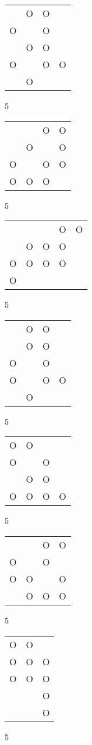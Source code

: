 \begin{tabular}{|m{0.2cm}m{0.2cm}m{0.2cm}m{0.2cm}|}\hline
 &O&O& \\
O& &O& \\
 &O&O& \\
O& &O&O\\
 &O& & \\
\hline\end{tabular}5
\begin{tabular}{|m{0.2cm}m{0.2cm}m{0.2cm}m{0.2cm}|}\hline
 & &O&O\\
 &O& &O\\
O& &O&O\\
O&O&O& \\
\hline\end{tabular}5
\begin{tabular}{|m{0.2cm}m{0.2cm}m{0.2cm}m{0.2cm}m{0.2cm}|}\hline
 & & &O&O\\
 &O&O&O& \\
O&O&O&O& \\
O& & & & \\
\hline\end{tabular}5
\begin{tabular}{|m{0.2cm}m{0.2cm}m{0.2cm}m{0.2cm}|}\hline
 &O&O& \\
 &O&O& \\
O& &O& \\
O& &O&O\\
 &O& & \\
\hline\end{tabular}5
\begin{tabular}{|m{0.2cm}m{0.2cm}m{0.2cm}m{0.2cm}|}\hline
O&O& & \\
O& &O& \\
 &O&O& \\
O&O&O&O\\
\hline\end{tabular}5
\begin{tabular}{|m{0.2cm}m{0.2cm}m{0.2cm}m{0.2cm}|}\hline
 & &O&O\\
O& &O& \\
O&O& &O\\
 &O&O&O\\
\hline\end{tabular}5
\begin{tabular}{|m{0.2cm}m{0.2cm}m{0.2cm}|}\hline
O&O& \\
O&O&O\\
O&O&O\\
 & &O\\
 & &O\\
\hline\end{tabular}5
